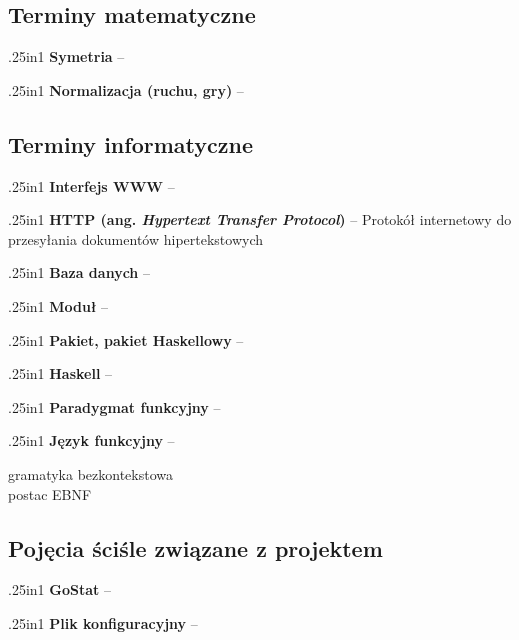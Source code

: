 \documentclass[12pt,leqno]{article}
\newcommand{\entry}[2]{
 \begin{hangparas}{.25in}{1}
  \noindent \textbf{#1} -- #2 \\
 \end{hangparas}
}
\begin{document}
\subsection{Terminy matematyczne}

\entry{Symetria}{}

\entry{Normalizacja (ruchu, gry)}{}

\subsection{Terminy informatyczne}

\entry{Interfejs WWW}{}

\entry{HTTP (ang. \emph{Hypertext Transfer Protocol})}{Protokół internetowy do przesyłania dokumentów hipertekstowych}

\entry{Baza danych}{}

\entry{Moduł}{}

\entry{Pakiet, pakiet Haskellowy}{}

\entry{Haskell}{}

\entry{Paradygmat funkcyjny}{}

\entry{Język funkcyjny}{}

gramatyka bezkontekstowa \\
postac EBNF \\ 

\subsection{Pojęcia ściśle związane z projektem}

\entry{GoStat}{}

\entry{Plik konfiguracyjny}{}
\end{document}
